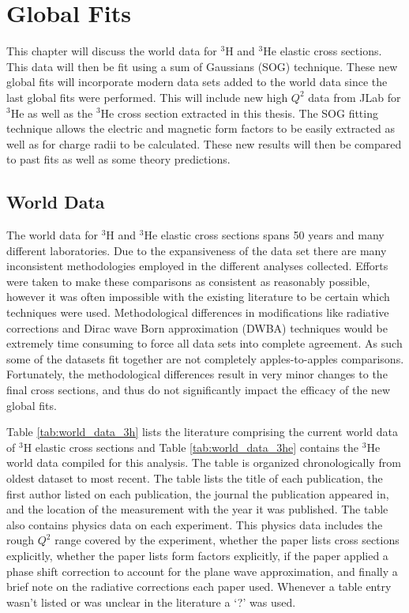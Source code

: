\chapter{Global Fits} %
\label{ch:global_fits} %

This chapter will discuss the world data for $^3$H and $^3$He elastic cross sections. This data will then be fit using a sum of Gaussians (SOG) technique. These new global fits will incorporate modern data sets added to the world data since the last global fits were performed. This will include new high $Q^2$ data from JLab for $^3$He as well as the $^3$He cross section extracted in this thesis. The SOG fitting technique allows the electric and magnetic form factors to be easily extracted as well as for charge radii to be calculated. These new results will then be compared to past fits as well as some theory predictions.

\section{World Data}
\label{sec:world_data}

The world data for $^3$H and $^3$He elastic cross sections spans 50 years and many different laboratories. Due to the expansiveness of the data set there are many inconsistent methodologies employed in the different analyses collected. Efforts were taken to make these comparisons as consistent as reasonably possible, however it was often impossible with the existing literature to be certain which techniques were used. Methodological differences in modifications like radiative corrections and Dirac wave Born approximation (DWBA) techniques would be extremely time consuming to force all data sets into complete agreement. As such some of the datasets fit together are not completely apples-to-apples comparisons. Fortunately, the methodological differences result in very minor changes to the final cross sections, and thus do not significantly impact the efficacy of the new global fits.

Table \ref{tab:world_data_3h} lists the literature comprising the current world data of $^3$H elastic cross sections and Table \ref{tab:world_data_3he} contains the $^3$He world data compiled for this analysis. The table is organized chronologically from oldest dataset to most recent. The table lists the title of each publication, the first author listed on each publication, the journal the publication appeared in, and the location of the measurement with the year it was published. The table also contains physics data on each experiment. This physics data includes the rough $Q^2$ range covered by the experiment, whether the paper lists cross sections explicitly, whether the paper lists form factors explicitly, if the paper applied a phase shift correction to account for the plane wave approximation, and finally a brief note on the radiative corrections each paper used. Whenever a table entry wasn't listed or was unclear in the literature a `?' was used.
 

